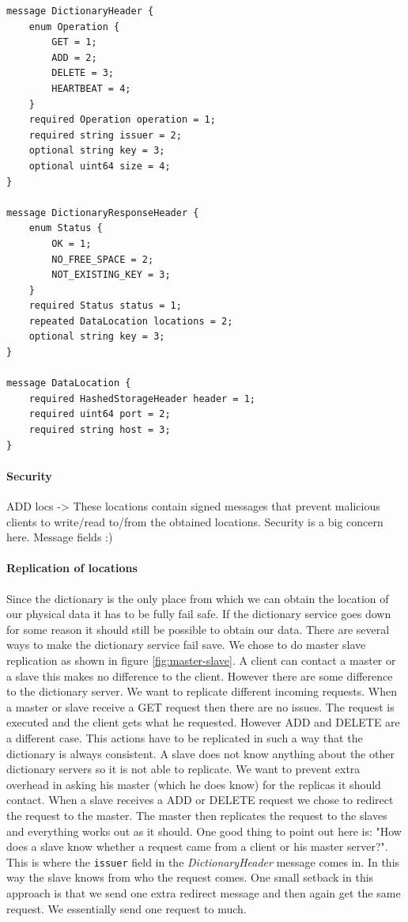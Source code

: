 \documentclass[12pt,a4paper]{scrartcl}
\begin{document}
\begin{verbatim}
message DictionaryHeader {
    enum Operation {
        GET = 1;
        ADD = 2;
        DELETE = 3;
        HEARTBEAT = 4;
    }
    required Operation operation = 1;
    required string issuer = 2;
    optional string key = 3;
    optional uint64 size = 4;
}

message DictionaryResponseHeader {
    enum Status {
        OK = 1;
        NO_FREE_SPACE = 2;
        NOT_EXISTING_KEY = 3;
    }
    required Status status = 1;
    repeated DataLocation locations = 2;
    optional string key = 3;
}

message DataLocation {
    required HashedStorageHeader header = 1;
    required uint64 port = 2;
    required string host = 3;
}
\end{verbatim}


\paragraph{Security}
ADD locs -> These locations contain signed messages that prevent malicious clients to write/read to/from the obtained locations. Security is a big concern here.
Message fields :)

\paragraph{Replication of locations}
Since the dictionary is the only place from which we can obtain the location of our physical data it has to be fully fail safe. If the dictionary service goes down for some reason it should still be possible to obtain our data. There are several ways to make the dictionary service fail save. We chose to do master slave replication as shown in figure \ref{fig:master-slave}. A client can contact a master or a slave this makes no difference to the client. However there are some difference to the dictionary server. We want to replicate different incoming requests. When a master or slave receive a GET request then there are no issues. The request is executed and the client gets what he requested. However ADD and DELETE are a different case. This actions have to be replicated in such a way that the dictionary is always consistent. A slave does not know anything about the other dictionary servers so it is not able to replicate. We want to prevent extra overhead in asking his master (which he does know) for the replicas it should contact. When a slave receives a ADD or DELETE request we chose to redirect the request to the master. The master then replicates the request to the slaves and everything works out as it should. One good thing to point out here is: "How does a slave know whether a request came from a client or his master server?". This is where the \texttt{issuer} field in the \textit{DictionaryHeader} message comes in. In this way the slave knows from who the request comes. One small setback in this approach is that we send one extra redirect message and then again get the same request. We essentially send one request to much.
\end{document}
